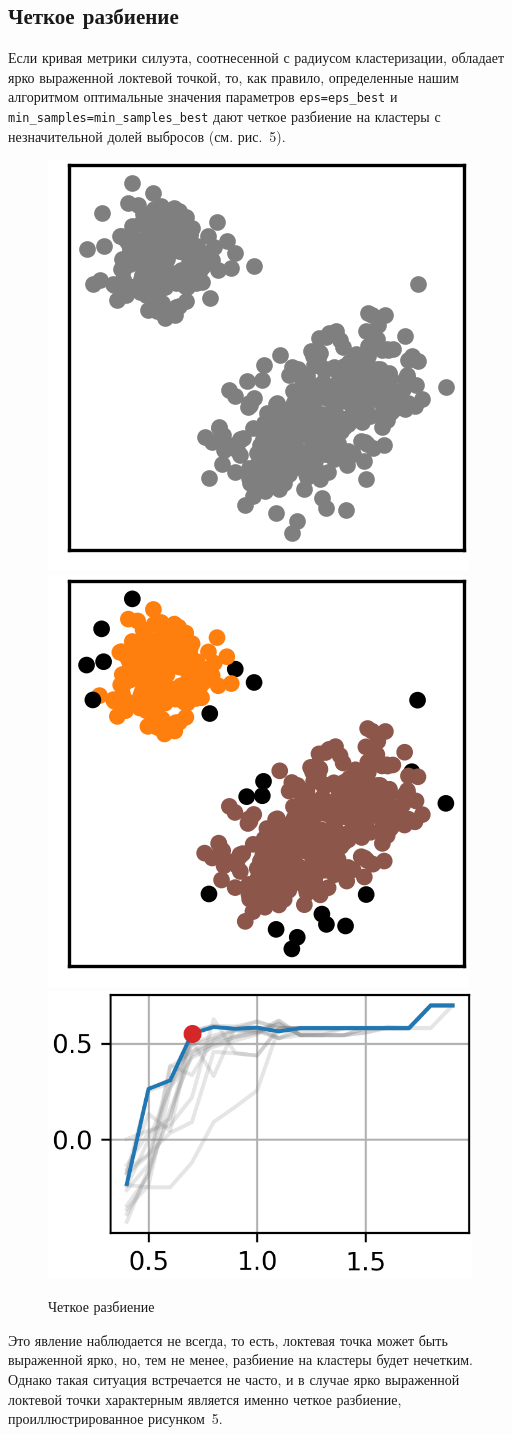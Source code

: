 \documentclass[a4paper,12pt]{article}
\begin{document}
\subsection{Четкое разбиение}


Если кривая метрики силуэта, соотнесенной с радиусом кластеризации, обладает ярко выраженной локтевой точкой, то, как правило, определенные нашим алгоритмом оптимальные значения параметров \texttt{eps=eps\_best} и \texttt{min\_samples=min\_samples\_best} дают четкое разбиение на кластеры с незначительной долей выбросов (см. рис. 5).

\begin{figure}[!h]
	\centering
	\includegraphics[width=0.25\linewidth]{pictures/Облако. Четко}
	\hspace{0.05\linewidth}
	\includegraphics[width=0.25\linewidth]{pictures/Кластеры. Четко}\\
	\includegraphics[width=0.42\linewidth]{pictures/Параметры. Четко}
	\\
	\caption{Четкое разбиение}
\end{figure}

Это явление наблюдается не всегда, то есть, локтевая точка может быть выраженной ярко, но, тем не менее, разбиение на кластеры будет нечетким. Однако такая ситуация встречается не часто, и в случае ярко выраженной локтевой точки характерным является именно четкое разбиение, проиллюстрированное рисунком 5.
\end{document}
